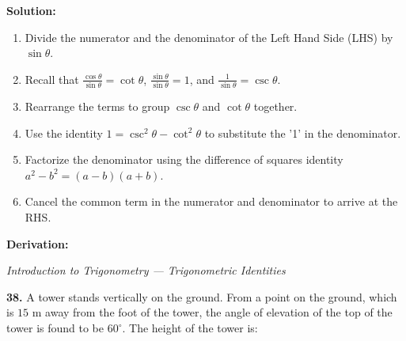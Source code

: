 \documentclass[12pt,a4paper]{exam}
\newcommand{\fitmath}[1]{%
  \sbox{\schmathbox}{$\displaystyle #1$}%
  \ifdim\wd\schmathbox>\linewidth
    \resizebox{\linewidth}{!}{\usebox{\schmathbox}}%
  \else
    \usebox{\schmathbox}%
  \fi}
\begin{document}
\begin{questions}
\textbf{Solution:}
\begin{enumerate}
  \item Divide the numerator and the denominator of the Left Hand Side (LHS) by $\sin \theta$.
  \item Recall that $\frac{\cos \theta}{\sin \theta} = \cot \theta$, $\frac{\sin \theta}{\sin \theta} = 1$, and $\frac{1}{\sin \theta} = \csc \theta$.
  \item Rearrange the terms to group $\csc \theta$ and $\cot \theta$ together.
  \item Use the identity $1 = \csc^2 \theta - \cot^2 \theta$ to substitute the '1' in the denominator.
  \item Factorize the denominator using the difference of squares identity $a^2 - b^2 = (a-b)(a+b)$.
  \item Cancel the common term in the numerator and denominator to arrive at the RHS.
\end{enumerate}
\textbf{Derivation:}
\begin{center}
\fitmath{\begin{aligned}
LHS = \frac{\frac{\cos \theta}{\sin \theta} - \frac{\sin \theta}{\sin \theta} + \frac{1}{\sin \theta}}{\frac{\cos \theta}{\sin \theta} + \frac{\sin \theta}{\sin \theta} - \frac{1}{\sin \theta}} = \frac{\cot \theta - 1 + \csc \theta}{\cot \theta + 1 - \csc \theta} \\
= \frac{\cot \theta + \csc \theta - (\csc^2 \theta - \cot^2 \theta)}{\cot \theta - \csc \theta + 1} \\
= \frac{(\cot \theta + \csc \theta) - [(\csc \theta - \cot \theta)(\csc \theta + \cot \theta)]}{\cot \theta - \csc \theta + 1} \\
= \frac{(\cot \theta + \csc \theta) [1 - (\csc \theta - \cot \theta)]}{\cot \theta - \csc \theta + 1} \\
= \frac{(\cot \theta + \csc \theta) [1 - \csc \theta + \cot \theta]}{\cot \theta - \csc \theta + 1} \\
= \cot \theta + \csc \theta = RHS
\end{aligned}}
\end{center}
\hfill \textit{Introduction to Trigonometry — Trigonometric Identities}
\vspace{0.3cm}

\question \textbf{38.} A tower stands vertically on the ground. From a point on the ground, which is $15$ m away from the foot of the tower, the angle of elevation of the top of the tower is found to be $60^\circ$. The height of the tower is:


\end{questions}
\end{document}
